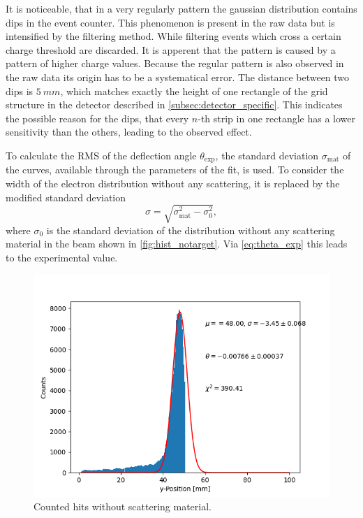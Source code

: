 \documentclass[sn-mathphys-num,iicol]{sn-jnl}
\theoremstyle{thmstyleone}
\theoremstyle{thmstyletwo}
\theoremstyle{thmstylethree}
\begin{document}
It is noticeable, that in a very regularly pattern the gaussian distribution contains dips in the event counter. %
This phenomenon is present in the raw data but is intensified by the filtering method.
While filtering events which cross a certain charge threshold are discarded.
It is apperent that the pattern is caused by a pattern of higher charge values.
Because the regular pattern is also observed in the raw data its origin has to be a systematical error. 
The distance between two dips is $\SI{5}{mm}$, which matches exactly the height of one rectangle of the grid structure in the detector described in \autoref{subsec:detector_specific}. 
This indicates the possible reason for the dips, that every $n$-th strip in one rectangle has a lower sensitivity than the others, leading to the observed effect.

To calculate the RMS of the deflection angle $\theta_\text{exp}$, the standard deviation $\sigma_\text{mat}$ of the curves, available through the parameters of the fit, is used. To consider the width of the electron distribution without any scattering, it is replaced by the modified standard deviation
\begin{equation} \label{eq:sigma_mod}
  \sigma = \sqrt{\sigma_\text{mat}^2 - \sigma_\text{0}^2},
\end{equation}
where $\sigma_\text{0}$ is the standard deviation of the distribution without any scattering material in the beam shown in \autoref{fig:hist_notarget}. 
Via \autoref{eq:theta_exp} this leads to the experimental value.

\begin{figure}
  \includegraphics[width=.9\linewidth]{../src/elsa/finished_plots/no target.png}
  \caption{Counted hits without scattering material.}
  \label{fig:hist_notarget}
\end{figure}
\end{document}
